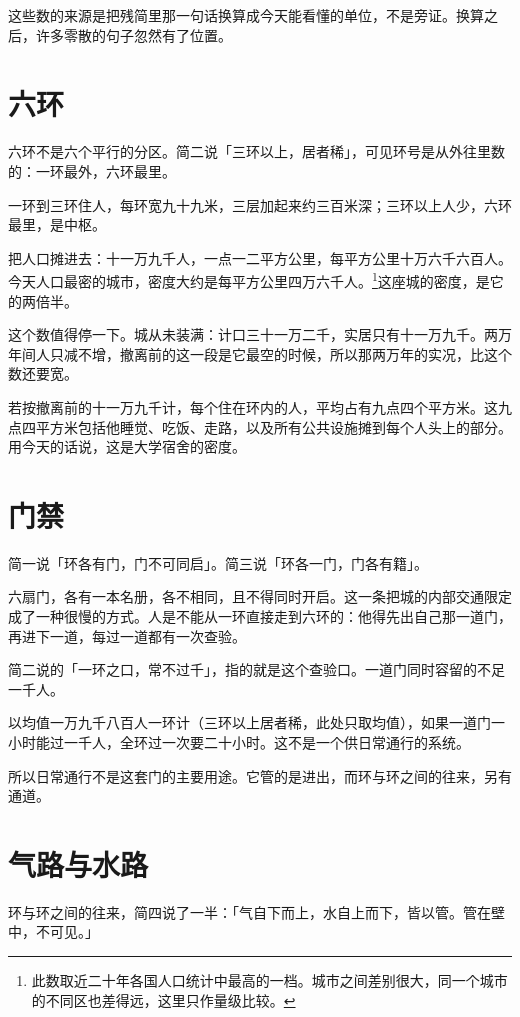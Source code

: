 这些数的来源是把残简里那一句话换算成今天能看懂的单位，不是旁证。换算之后，许多零散的句子忽然有了位置。

\section{六环}

六环不是六个平行的分区。简二说「三环以上，居者稀」，可见环号是从外往里数的：一环最外，六环最里。

一环到三环住人，每环宽九十九米，三层加起来约三百米深；三环以上人少，六环最里，是中枢。

把人口摊进去：十一万九千人，一点一二平方公里，每平方公里十万六千六百人。今天人口最密的城市，密度大约是每平方公里四万六千人。\footnote{此数取近二十年各国人口统计中最高的一档。城市之间差别很大，同一个城市的不同区也差得远，这里只作量级比较。}这座城的密度，是它的两倍半。

这个数值得停一下。城从未装满：计口三十一万二千，实居只有十一万九千。两万年间人只减不增，撤离前的这一段是它最空的时候，所以那两万年的实况，比这个数还要宽。

若按撤离前的十一万九千计，每个住在环内的人，平均占有九点四个平方米。这九点四平方米包括他睡觉、吃饭、走路，以及所有公共设施摊到每个人头上的部分。用今天的话说，这是大学宿舍的密度。

\section{门禁}

简一说「环各有门，门不可同启」。简三说「环各一门，门各有籍」。

六扇门，各有一本名册，各不相同，且不得同时开启。这一条把城的内部交通限定成了一种很慢的方式。人是不能从一环直接走到六环的：他得先出自己那一道门，再进下一道，每过一道都有一次查验。

简二说的「一环之口，常不过千」，指的就是这个查验口。一道门同时容留的不足一千人。

以均值一万九千八百人一环计（三环以上居者稀，此处只取均值），如果一道门一小时能过一千人，全环过一次要二十小时。这不是一个供日常通行的系统。

所以日常通行不是这套门的主要用途。它管的是进出，而环与环之间的往来，另有通道。

\section{气路与水路}

环与环之间的往来，简四说了一半：「气自下而上，水自上而下，皆以管。管在壁中，不可见。」

